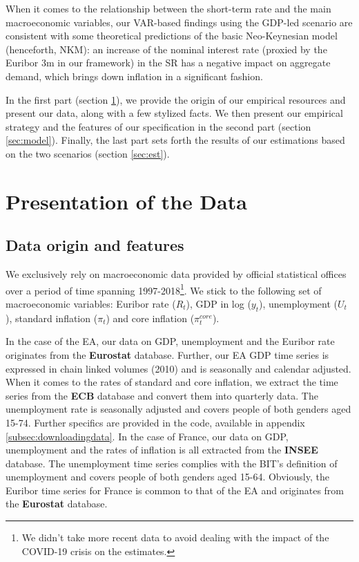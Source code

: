 \documentclass[
  11pt,
]{article}
\begin{document}
When it comes to the relationship between the short-term rate and the main macroeconomic variables, our VAR-based findings using the GDP-led scenario are consistent with some theoretical predictions of the basic Neo-Keynesian model (henceforth, NKM): an increase of the nominal interest rate (proxied by the Euribor 3m in our framework) in the SR has a negative impact on aggregate demand, which brings down inflation in a significant fashion.

In the first part (section \ref{sec:data}), we provide the origin of our empirical resources and present our data, along with a few stylized facts.
We then present our empirical strategy and the features of our specification in the second part (section \ref{sec:model}).
Finally, the last part sets forth the results of our estimations based on the two scenarios (section \ref{sec:est}).

\pagebreak

\hypertarget{sec:data}{%
\section{Presentation of the Data}\label{sec:data}}

\hypertarget{data-origin-and-features}{%
\subsection{Data origin and features}\label{data-origin-and-features}}

We exclusively rely on macroeconomic data provided by official statistical offices over a period of time spanning 1997-2018\footnote{
  We didn't take more recent data to avoid dealing with the impact of the COVID-19 crisis on the estimates.}. We stick to the following set of macroeconomic variables: Euribor rate (\(R_t\)), GDP in log (\(y_t\)), unemployment (\(U_t\)), standard inflation (\(\pi_t\)) and core inflation (\(\pi_t^{core}\)).

In the case of the EA, our data on GDP, unemployment and the Euribor rate originates from the \textbf{Eurostat} database.
Further, our EA GDP time series is expressed in chain linked volumes (2010) and is seasonally and calendar adjusted.
When it comes to the rates of standard and core inflation, we extract the time series from the \textbf{ECB} database and convert them into quarterly data.
The unemployment rate is seasonally adjusted and covers people of both genders aged 15-74.
Further specifics are provided in the code, available in appendix \ref{subsec:downloadingdata}.
In the case of France, our data on GDP, unemployment and the rates of inflation is all extracted from the \textbf{INSEE} database.
The unemployment time series complies with the BIT's definition of unemployment and covers people of both genders aged 15-64.
Obviously, the Euribor time series for France is common to that of the EA and originates from the \textbf{Eurostat} database.
\end{document}
